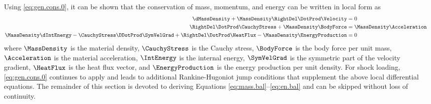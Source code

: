 \documentclass[10pt]{article}
\begin{document}
Using \eqref{eq:gen.cons.0}, it can be shown that the conservation of mass, momentum, and energy can be written in local form as
%
\begin{align}
  \label{eq:mass.bal}
  \dMassDensity + \MassDensity\RightDel\DotProd\Velocity &= 0 \\
  \label{eq:mom.bal}
  \RightDel\DotProd\CauchyStress + \MassDensity\BodyForce &=
  \MassDensity\Acceleration \\
  \label{eq:en.bal}
  \MassDensity\dIntEnergy - \CauchyStress\DDotProd\SymVelGrad +
  \RightDel\DotProd\HeatFlux - \MassDensity\EnergyProduction &= 0
\end{align}
%
where $\MassDensity$ is the material density, %
$\CauchyStress$ is the Cauchy stress, %
$\BodyForce$ is the body force per unit mass, %
$\Acceleration$ is the material acceleration, %
$\IntEnergy$ is the internal energy, %
$\SymVelGrad$ is the symmetric part of the velocity gradient, %
$\HeatFlux$ is the heat flux vector, and %
$\EnergyProduction$ is the energy production per unit density.  %
For shock loading, \eqref{eq:gen.cons.0} continues to apply and leads to additional
Rankine-Hugoniot jump conditions that supplement the above local differential
equations. %
%
%
%
%
%
The remainder of this section is devoted to deriving Equations
\ref{eq:mass.bal}--\ref{eq:en.bal} and can be skipped without loss of continuity.

\end{document}
